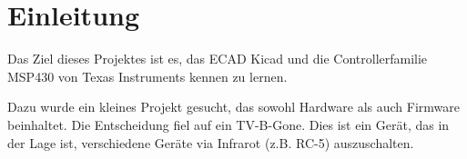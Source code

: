 



\section{Einleitung}
Das Ziel dieses Projektes ist es, das ECAD Kicad und die Controllerfamilie MSP430 von Texas Instruments kennen zu lernen. 

Dazu wurde ein kleines Projekt gesucht, das sowohl Hardware als auch Firmware beinhaltet. Die Entscheidung fiel auf ein TV-B-Gone. Dies ist ein Gerät, das in der Lage ist, verschiedene Geräte via Infrarot (z.B. RC-5) auszuschalten. 